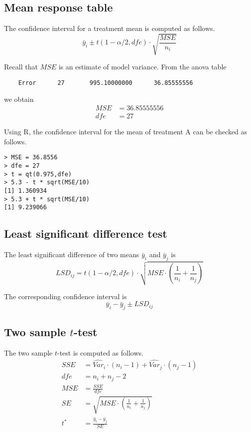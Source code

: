 \documentclass[12pt]{article}
\begin{document}
\subsection*{Mean response table}

The confidence interval for a treatment mean is computed as follows.
\[
\bar y_i\pm t(1-\alpha/2,dfe)\cdot\sqrt{\frac{MSE}{n_i}}
\]

Recall that $MSE$ is an estimate of model variance.
From the anova table

{\scriptsize\begin{verbatim}
    Error      27       995.10000000      36.85555556
\end{verbatim}}

we obtain
\begin{align*}
MSE&=36.85555556\\
dfe&=27
\end{align*}

Using R, the confidence interval for the mean of treatment A can be
checked as follows.

{\scriptsize\begin{verbatim}
> MSE = 36.8556
> dfe = 27
> t = qt(0.975,dfe)
> 5.3 - t * sqrt(MSE/10)
[1] 1.360934
> 5.3 + t * sqrt(MSE/10)
[1] 9.239066
\end{verbatim}}

\subsection*{Least significant difference test}

The least significant difference of two means
$\bar y_i$ and $\bar y_j$ is
\[
LSD_{ij}=t(1-\alpha/2,dfe)\cdot\sqrt{MSE\cdot
\left(\frac{1}{n_i}+\frac{1}{n_j}\right)}
\]

The corresponding confidence interval is
\[
\bar y_i-\bar y_j\pm LSD_{ij}
\]

\subsection*{Two sample $t$-test}

The two sample $t$-test is computed as follows.
\begin{align*}
SSE&=\widehat{Var}_i\cdot(n_i-1)+\widehat{Var}_j\cdot(n_j-1)\\
dfe&=n_i+n_j-2\\
MSE&=\frac{SSE}{dfe}\\
SE&=\sqrt{MSE\cdot\left(\frac{1}{n_i}+\frac{1}{n_j}\right)}\\
t^*&=\frac{\bar y_i-\bar y_j}{SE}
\end{align*}
\end{document}
